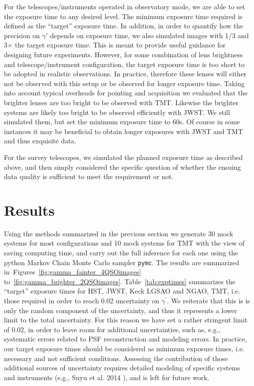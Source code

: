 \documentclass[a4paper,11pt]{article}
\begin{document}
For the telescopes/instruments operated in observatory mode, we are
able to set the exposure time to any desired level. The minimum
exposure time required is defined as the ``target'' exposure time. In
addition, in order to quantify how the precision on $\gamma'$ depends
on exposure time, we also simulated images with 1/3 and 3$\times$ the
target exposure time. This is meant to provide useful guidance for
designing future experiments. However, for some combination of lens
brightness and telescope/instrument configuration, the target exposure
time is too short to be adopted in realistic observations. In
practice, therefore these lenses will either not be observed with this
setup or be observed for longer exposure time. Taking into account
typical overheads for pointing and acquisition we evaluated that the
brighter lenses are too bright to be observed with TMT.  Likewise the
brighter systems are likely too bright to be observed efficiently with
JWST. We still simulated them, but set the minimum exposure time to
60s. Of course in some instances it may be beneficial to obtain longer
exposures with JWST and TMT and thus exquisite data.

For the survey telescopes, we simulated the planned exposure time as
described above, and then  simply considered the specific question of
whether the ensuing data quality is sufficient to meet the requirement
or not.

\section{Results}

Using the methods summarized in the previous section we generate 30
mock systems for most configurations and 10 mock systems for TMT with
the view of saving computing time, and carry out the full inference
for each one using the python Markov Chain Monte Carlo sampler
\texttt{pymc}.  The results are summarized
in~Figures~\ref{fig:gamma_fainter_4QSOimages}
to~\ref{fig:gamma_brighter_2QSOimages}. Table~\ref{tab:exptimes}
summarizes the ``target'' exposure times for HST, JWST, Keck LGSAO and
NGAO, TMT, i.e. those required in order to reach 0.02 uncertainty on
$\gamma^{\prime}$.  We reiterate that this is is only the random
component of the uncertainty, and thus it represents a lower limit to
the total uncertainty. For this reason we have set a rather stringent
limit of 0.02, in order to leave room for additional uncertainties,
such as, e.g., systematic errors related to PSF reconstruction and
modeling errors.  In practice, our target exposure times should be
considered as minimum exposure times, i.e. necessary and not
sufficient conditions. Assessing the contribution of those additional
sources of uncertainty requires detailed modeling of specific systems
and instruments (e.g., Suyu et al. 2014 \cite{2014ApJ...788L..35S}),
and is left for future work.
\end{document}
